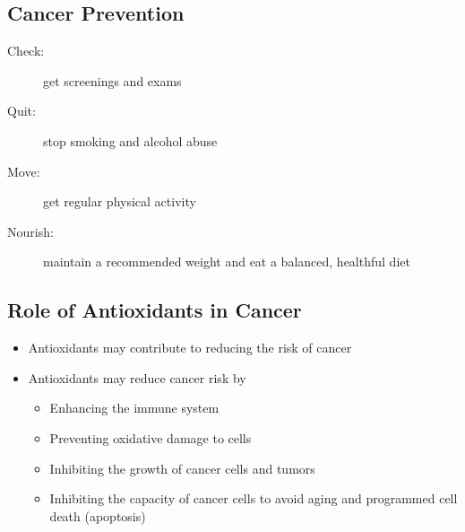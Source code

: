 \documentclass[title={Chapter 8}]{fdsn201notes}
\begin{document}
\subsection{Cancer Prevention}\label{subsec:cancer-prevention}
\begin{description}
	\item[Check:] get screenings and exams
	\item[Quit:] stop smoking and alcohol abuse
	\item[Move:] get regular physical activity
	\item[Nourish:] maintain a recommended weight and eat a balanced, healthful diet
\end{description}

\subsection{Role of Antioxidants in Cancer}\label{subsec:Role of Antioxidants in Cancer}
\begin{itemize}
	\item Antioxidants may contribute to reducing the risk of cancer
	\item Antioxidants may reduce cancer risk by
	\begin{itemize}
		\item Enhancing the immune system
		\item Preventing oxidative damage to cells
		\item Inhibiting the growth of cancer cells and tumors
		\item Inhibiting the capacity of cancer cells to avoid aging and programmed cell death (apoptosis)
	\end{itemize}
\end{itemize}
\end{document}
